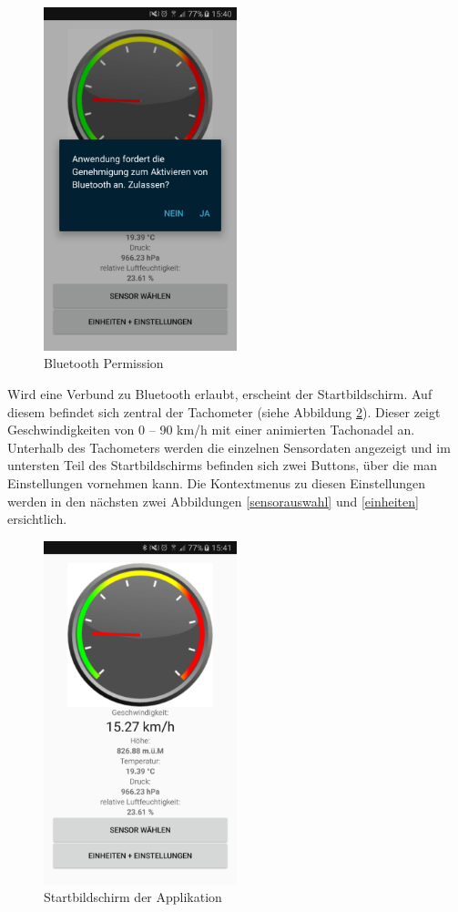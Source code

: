 \begin{figure}[ht]
    \includegraphics[width=0.5\textwidth]{4Resultate/imag/BLEBluetoothPermission.png} 
    \caption{Bluetooth Permission}
    \label{permission}
\end{figure}

Wird eine Verbund zu Bluetooth erlaubt, erscheint der Startbildschirm. Auf diesem befindet sich zentral der Tachometer (siehe Abbildung \ref{tacho}). Dieser zeigt Geschwindigkeiten von 0 – 90 km/h mit einer animierten Tachonadel an. Unterhalb des Tachometers werden die einzelnen Sensordaten angezeigt und im untersten Teil des Startbildschirms befinden sich zwei Buttons, über die man Einstellungen vornehmen kann. Die Kontextmenus zu diesen Einstellungen werden in den nächsten zwei Abbildungen \ref{sensorauswahl} und \ref{einheiten} ersichtlich. 

\begin{figure}[ht]
    \includegraphics[width=0.5\textwidth]{4Resultate/imag/APPHomeScreen.png} 
    \caption{Startbildschirm der Applikation}
    \label{tacho}
\end{figure}


